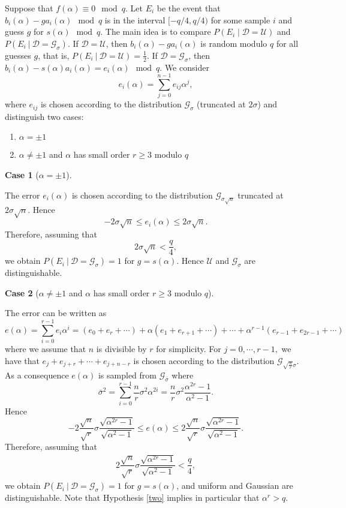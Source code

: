 \documentclass{llncs}
\newcommand{\<}{\langle}
\renewcommand{\>}{\rangle}
\begin{document}
Suppose that
$f(\alpha) \equiv 0 \mod q$.
Let $E_i$ be the event that $b_i(\alpha)-ga_i(\alpha) \mod q$ is in the interval  $[-q/4, q/4)$ for some sample $i$ and guess $g$ for $s(\alpha) \mod q$. The main idea is to compare $P(E_i\mid\mathcal{D}=\mathcal{U})$ and $P(E_i\ | \ \mathcal{D} = \mathcal{G}_{\sigma}).$
If $\mathcal{D} = \mathcal{U}$, then $b_i(\alpha)-ga_i(\alpha)$ is random modulo $ q$ for all guesses $g $, that is,
$P(E_i \ | \ \mathcal{D} = \mathcal{U}) =\frac{1}{2}.$
If $\mathcal{D} = \mathcal{G}_{\sigma}$, then $b_i(\alpha)-s(\alpha)a_i(\alpha)=e_i(\alpha) \mod{q}$.
We consider $$e_i(\alpha)=\sum_{j=0}^{n-1} e_{ij} \alpha^j,$$ where $e_{ij}$ is chosen according to the distribution $\mathcal{G}_{\sigma}$ (truncated at $2\sigma$) and distinguish two cases:
\begin{enumerate}
\item $\alpha = \pm 1$ \label{one}
\item $\alpha \neq \pm 1$ and $\alpha$ has small order $r\geq 3$ modulo $ q$ \label{two}
\end{enumerate}

{\bf Case 1} ($\alpha = \pm 1$).

The error $e_i( \alpha )$ is chosen according to the distribution $\mathcal{G}_{ \sigma \sqrt{n} }$ truncated at $2 \sigma \sqrt{n}$.
Hence $$ -2  \sigma \sqrt{n}\leq e_i( \alpha ) \leq 2   \sigma\sqrt{n}.$$
Therefore, assuming that $$2  \sigma \sqrt{n} < \dfrac{q}{4},$$ we obtain
$P(E_i \ | \ \mathcal{D} = \mathcal{G}_{\sigma})=1$ for $g=s(\alpha)$.  Hence $\mathcal{U}$ and $\mathcal{G}_\sigma$ are distinguishable.

{\bf Case 2} ($\alpha \neq \pm 1$ and $\alpha$ has small order $r\geq 3$ modulo $ q$).

The error can be written as
$$e(\alpha)= \sum_{i=0}^{r-1} e_i \alpha^i = (e_{0}+e_{r}+ \cdots) + \alpha(e_1+e_{r+1}+\cdots) + \cdots + \alpha^{r-1}(e_{r-1}+e_{2r-1}+\cdots)$$
where we assume that $n$ is divisible by $r$ for simplicity.
For $j=0, \cdots,r -1,$ we have that $ e_j + e_{ j+r } + \cdots + e_{ j+ n-r }  $ is chosen according to the distribution $ \mathcal{G}_{\sqrt{\frac{n}{r}} \sigma  }$.
As a consequence $e(\alpha)$ is sampled from $\mathcal{G}_{ \bar{\sigma} }$ where $$\bar{\sigma}^2 = \sum_{i=0}^{r-1} \dfrac{n}{r} \sigma^2 \alpha^{2i} = \dfrac{n}{r} \sigma^2 \dfrac{\alpha^{2r}-1}{\alpha^2-1}.$$
Hence $$ -2 \dfrac{\sqrt{n}}{\sqrt{r}} \sigma \dfrac{\sqrt{\alpha^{2r}-1}}{\sqrt{\alpha^2-1}} \leq e( \alpha ) \leq 2  \dfrac{\sqrt{n}}{\sqrt{r}} \sigma \dfrac{\sqrt{\alpha^{2r}-1}}{\sqrt{\alpha^2-1}} .$$
Therefore, assuming that
\begin{align} \label{bound}
2 \dfrac{\sqrt{n}}{\sqrt{r}} \sigma \dfrac{\sqrt{\alpha^{2r}-1}}{\sqrt{\alpha^2-1}} < \dfrac{q}{4},
\end{align}
we obtain
$P(E_i \ | \ \mathcal{D} = \mathcal{G}_{\sigma})=1$
for $g=s(\alpha)$, and uniform and Gaussian are distinguishable.
Note that Hypothesis \eqref{two} implies in particular that $\alpha^r >q$.\\
\end{document}
